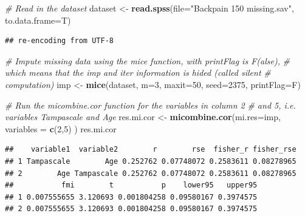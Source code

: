 \documentclass[]{book}
\newenvironment{Shaded}{\begin{snugshade}}{\end{snugshade}}
\newcommand{\KeywordTok}[1]{\textcolor[rgb]{0.13,0.29,0.53}{\textbf{#1}}}
\newcommand{\DataTypeTok}[1]{\textcolor[rgb]{0.13,0.29,0.53}{#1}}
\newcommand{\DecValTok}[1]{\textcolor[rgb]{0.00,0.00,0.81}{#1}}
\newcommand{\StringTok}[1]{\textcolor[rgb]{0.31,0.60,0.02}{#1}}
\newcommand{\CommentTok}[1]{\textcolor[rgb]{0.56,0.35,0.01}{\textit{#1}}}
\newcommand{\NormalTok}[1]{#1}
\theoremstyle{definition}
\theoremstyle{definition}
\theoremstyle{definition}
\theoremstyle{remark}
\begin{document}
\begin{Shaded}
\begin{Highlighting}[]
\CommentTok{# Read in the dataset }
\NormalTok{dataset <-}\StringTok{ }\KeywordTok{read.spss}\NormalTok{(}\DataTypeTok{file=}\StringTok{"Backpain 150 missing.sav"}\NormalTok{, }\DataTypeTok{to.data.frame=}\NormalTok{T)}
\end{Highlighting}
\end{Shaded}

\begin{verbatim}
## re-encoding from UTF-8
\end{verbatim}

\begin{Shaded}
\begin{Highlighting}[]
\CommentTok{# Impute missing data using the mice function, with printFlag is F(alse), }
\CommentTok{# which means that the imp and iter information is hided (called silent }
\CommentTok{# computation)}
\NormalTok{imp <-}\StringTok{ }\KeywordTok{mice}\NormalTok{(dataset, }\DataTypeTok{m=}\DecValTok{3}\NormalTok{, }\DataTypeTok{maxit=}\DecValTok{50}\NormalTok{, }\DataTypeTok{seed=}\DecValTok{2375}\NormalTok{, }\DataTypeTok{printFlag=}\NormalTok{F)}

\CommentTok{# Run the micombine.cor function for the variables in column 2 }
\CommentTok{# and 5, i.e. variables Tampascale and Age}
\NormalTok{res.mi.cor <-}\StringTok{ }\KeywordTok{micombine.cor}\NormalTok{(}\DataTypeTok{mi.res=}\NormalTok{imp, }\DataTypeTok{variables =} \KeywordTok{c}\NormalTok{(}\DecValTok{2}\NormalTok{,}\DecValTok{5}\NormalTok{) )}
\NormalTok{res.mi.cor}
\end{Highlighting}
\end{Shaded}

\begin{verbatim}
##    variable1  variable2        r        rse  fisher_r fisher_rse
## 1 Tampascale        Age 0.252762 0.07748072 0.2583611 0.08278965
## 2        Age Tampascale 0.252762 0.07748072 0.2583611 0.08278965
##           fmi        t           p    lower95   upper95
## 1 0.007555655 3.120693 0.001804258 0.09580167 0.3974575
## 2 0.007555655 3.120693 0.001804258 0.09580167 0.3974575
\end{verbatim}

\begin{Shaded}
\end{Shaded}
\end{document}
